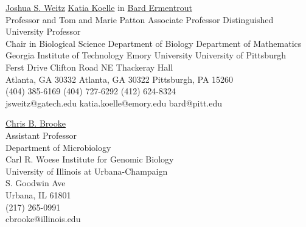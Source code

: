\documentclass[a4paper,10pt]{article}
\begin{document}
        \begin{tabbing}
        \hskip 1in \= \href{http://weitzgroup.biosci.gatech.edu/}{Joshua S. Weitz}              \hskip 1in \= \href{https://scholarblogs.emory.edu/koellelab/}{Katia Koelle}      in \= \href{https://www.pitt.edu/~phase/}{Bard Ermentrout} \\    
        \>  Professor and Tom and Marie Patton 										\> Associate Professor								\> Distinguished University Professor \\	
        \> Chair in Biological Science	           										\> Department of Biology         			        				\> Department of Mathematics	\\
        \> Georgia Institute of Technology	            									\> Emory University	    					       			\> University of Pittsburgh \\
         Ferst Drive                												 Clifton Road NE				                 		 Thackeray Hall \\
        \> Atlanta, GA 30332														\> Atlanta, GA 30322		                     					\> Pittsburgh, PA  15260  \\
        \> (404) 385-6169														\> (404) 727-6292        			                 			\> (412) 624-8324   \\   
        \> jsweitz@gatech.edu													\> katia.koelle@emory.edu                       	    				\> bard@pitt.edu   \\
        \end{tabbing}
        
        \begin{tabbing}
        \hskip 1in \= \href{https://www.brookelab.org/}{Chris B. Brooke} \\
        \>  Assistant Professor \\
        \> Department of Microbiology \\
        \> Carl R. Woese Institute for Genomic Biology \\
        \> University of Illinois at Urbana-Champaign \\	      
         S. Goodwin Ave \\
        \> Urbana, IL 61801 \\
        \> (217) 265-0991 \\
        \> cbrooke@illinois.edu \\
        \end{tabbing}
        
\end{document}
